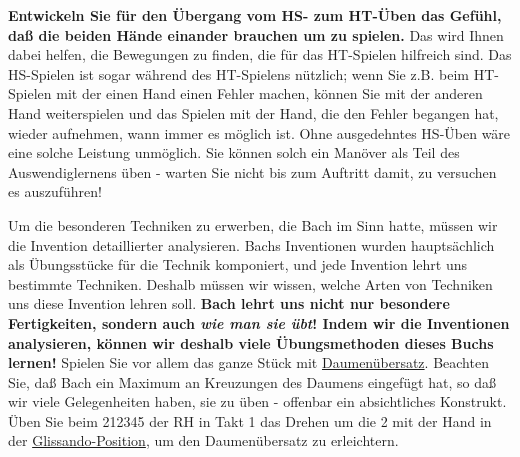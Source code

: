 \textbf{Entwickeln Sie für den Übergang vom HS- zum HT-Üben das Gefühl, daß die beiden Hände einander brauchen um zu spielen.}
Das wird Ihnen dabei helfen, die Bewegungen zu finden, die für das HT-Spielen hilfreich sind.
Das HS-Spielen ist sogar während des HT-Spielens nützlich; wenn Sie z.B. beim HT-Spielen mit der einen Hand einen Fehler machen, können Sie mit der anderen Hand weiterspielen und das Spielen mit der Hand, die den Fehler begangen hat, wieder aufnehmen, wann immer es möglich ist.
Ohne ausgedehntes HS-Üben wäre eine solche Leistung unmöglich.
Sie können solch ein Manöver als Teil des Auswendiglernens üben - warten Sie nicht bis zum Auftritt damit, zu versuchen es auszuführen!

Um die besonderen Techniken zu erwerben, die Bach im Sinn hatte, müssen wir die Invention detaillierter analysieren.
Bachs Inventionen wurden hauptsächlich als Übungsstücke für die Technik komponiert, und jede Invention lehrt uns bestimmte Techniken.
Deshalb müssen wir wissen, welche Arten von Techniken uns diese Invention lehren soll.
\textbf{Bach lehrt uns nicht nur besondere Fertigkeiten, sondern auch \textit{wie man sie übt}! Indem wir die Inventionen analysieren, können wir deshalb viele Übungsmethoden dieses Buchs lernen!}
Spielen Sie vor allem das ganze Stück mit \hyperlink{c1iii5b}{Daumenübersatz}.
Beachten Sie, daß Bach ein Maximum an Kreuzungen des Daumens eingefügt hat, so daß wir viele Gelegenheiten haben, sie zu üben - offenbar ein absichtliches Konstrukt.
Üben Sie beim 212345 der RH in Takt 1 das Drehen um die 2 mit der Hand in der \hyperlink{c1iii5c}{Glissando-Position}, um den Daumenübersatz zu erleichtern.


